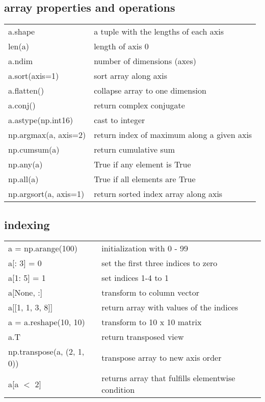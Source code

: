 \documentclass[10pt, a4paper, twocolumn]{article}
\begin{document}
\subsection*{array properties and operations}
\begin{tabular}{ p{} p{} }
 a.shape & a tuple with the lengths of each axis\\
 len(a) & length of axis 0\\
 a.ndim & number of dimensions (axes)\\
 a.sort(axis=1) & sort array along axis\\
 a.flatten() & collapse array to one dimension\\
 a.conj() & return complex conjugate\\
 a.astype(np.int16) & cast to integer\\
 np.argmax(a, axis=2) & return index of maximum along a given axis\\
 np.cumsum(a) & return cumulative sum\\
 np.any(a) & True if any element is True\\
 np.all(a) & True if all elements are True\\
 np.argsort(a, axis=1) & return sorted index array along axis\\
\end{tabular}

\subsection*{indexing}
\begin{tabular}{ p{} p{} }
 a = np.arange(100) & initialization with 0 - 99\\
 a[: 3] = 0 & set the first three indices to zero\\
a[1: 5] = 1 & set indices 1-4 to 1\\
a[None, :] & transform to column vector\\
a[[1, 1, 3, 8]] & return array with values of the indices\\
a = a.reshape(10, 10) & transform to 10 x 10 matrix\\
a.T & return transposed view\\
np.transpose(a, (2, 1, 0)) & transpose array to new axis order\\
                  a[a $<$ 2] & returns array that fulfills elementwise condition\\
\end{tabular}
\end{document}
